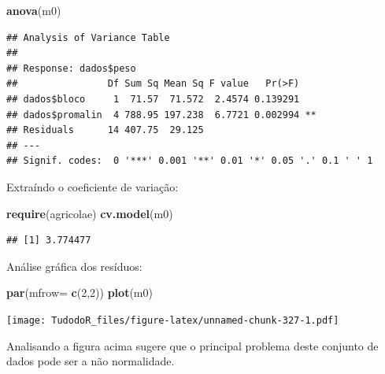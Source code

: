 \documentclass[
]{book}
\newenvironment{Shaded}{\begin{snugshade}}{\end{snugshade}}
\newcommand{\DataTypeTok}[1]{\textcolor[rgb]{0.13,0.29,0.53}{#1}}
\newcommand{\DecValTok}[1]{\textcolor[rgb]{0.00,0.00,0.81}{#1}}
\newcommand{\KeywordTok}[1]{\textcolor[rgb]{0.13,0.29,0.53}{\textbf{#1}}}
\newcommand{\NormalTok}[1]{#1}
\newcommand{\OperatorTok}[1]{\textcolor[rgb]{0.81,0.36,0.00}{\textbf{#1}}}
\newcommand{\StringTok}[1]{\textcolor[rgb]{0.31,0.60,0.02}{#1}}
\begin{document}
\begin{Shaded}
\end{Shaded}

\begin{Shaded}
\begin{Highlighting}[]
\KeywordTok{anova}\NormalTok{(m0)}
\end{Highlighting}
\end{Shaded}

\begin{verbatim}
## Analysis of Variance Table
## 
## Response: dados$peso
##                Df Sum Sq Mean Sq F value   Pr(>F)   
## dados$bloco     1  71.57  71.572  2.4574 0.139291   
## dados$promalin  4 788.95 197.238  6.7721 0.002994 **
## Residuals      14 407.75  29.125                    
## ---
## Signif. codes:  0 '***' 0.001 '**' 0.01 '*' 0.05 '.' 0.1 ' ' 1
\end{verbatim}

Extraíndo o coeficiente de variação:

\begin{Shaded}
\begin{Highlighting}[]
\KeywordTok{require}\NormalTok{(agricolae)}
\KeywordTok{cv.model}\NormalTok{(m0)}
\end{Highlighting}
\end{Shaded}

\begin{verbatim}
## [1] 3.774477
\end{verbatim}

Análise gráfica dos resíduos:

\begin{Shaded}
\begin{Highlighting}[]
\KeywordTok{par}\NormalTok{(}\DataTypeTok{mfrow=} \KeywordTok{c}\NormalTok{(}\DecValTok{2}\NormalTok{,}\DecValTok{2}\NormalTok{))}
\KeywordTok{plot}\NormalTok{(m0)}
\end{Highlighting}
\end{Shaded}

\texttt{[image: TudodoR\_files/figure-latex/unnamed-chunk-327-1.pdf]}

Analisando a figura acima sugere que o principal problema deste conjunto de dados pode ser a não normalidade.
\end{document}
